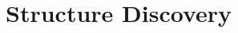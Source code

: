 \chapter{Structure Discovery}
\begin{refsection}
%
\printbibliography[heading=subbibliography]
\end{refsection}
